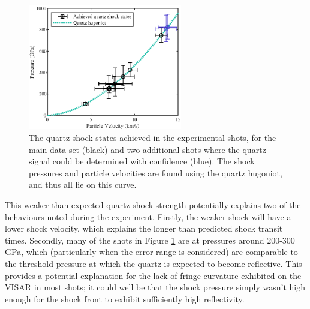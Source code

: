 \begin{figure} [h]
\begin{centering}
\includegraphics[width=0.6\textwidth]{figures/Experiment/QuartzShockStates_edit.eps}%
\caption{\label{fig:QuartzShockStates} The quartz shock states achieved in the experimental shots, for the main data set (black) and two additional shots where the quartz signal could be determined with confidence (blue). The shock pressures and particle velocities are found using the quartz hugoniot, and thus all lie on this curve.}
\end{centering}
\end{figure}

This weaker than expected quartz shock strength potentially explains two of the behaviours noted during the experiment. Firstly, the weaker shock will have a lower shock velocity, which explains the longer than predicted shock transit times. Secondly,  many of the shots in Figure \ref{fig:QuartzShockStates} are at pressures around 200-300 GPa, which (particularly when the error range is considered) are comparable to the threshold pressure at which the quartz is expected to become reflective. This provides a potential explanation for the lack of fringe curvature exhibited on the VISAR in most shots; it could well be that the shock pressure simply wasn't high enough for the shock front to exhibit sufficiently high reflectivity. 

